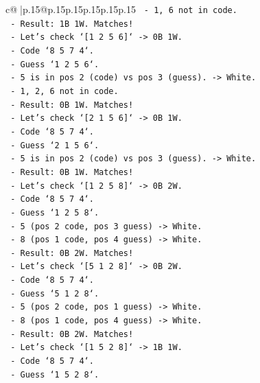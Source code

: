 \documentclass{article}
\begin{document}
{\begin{supertabular}{c@{$\;$}|p{.15\linewidth}@{}p{.15\linewidth}p{.15\linewidth}p{.15\linewidth}p{.15\linewidth}p{.15\linewidth}}
{{{\texttt{          {-} 1, 6 not in code.} \\
\texttt{          {-} Result: 1B 1W. Matches!} \\
\texttt{        {-} Let's check `{[}1 2 5 6{]}` {-}> 0B 1W.} \\
\texttt{          {-} Code `8 5 7 4`.} \\
\texttt{          {-} Guess `1 2 5 6`.} \\
\texttt{          {-} 5 is in pos 2 (code) vs pos 3 (guess). {-}> White.} \\
\texttt{          {-} 1, 2, 6 not in code.} \\
\texttt{          {-} Result: 0B 1W. Matches!} \\
\texttt{        {-} Let's check `{[}2 1 5 6{]}` {-}> 0B 1W.} \\
\texttt{          {-} Code `8 5 7 4`.} \\
\texttt{          {-} Guess `2 1 5 6`.} \\
\texttt{          {-} 5 is in pos 2 (code) vs pos 3 (guess). {-}> White.} \\
\texttt{          {-} Result: 0B 1W. Matches!} \\
\texttt{        {-} Let's check `{[}1 2 5 8{]}` {-}> 0B 2W.} \\
\texttt{          {-} Code `8 5 7 4`.} \\
\texttt{          {-} Guess `1 2 5 8`.} \\
\texttt{          {-} 5 (pos 2 code, pos 3 guess) {-}> White.} \\
\texttt{          {-} 8 (pos 1 code, pos 4 guess) {-}> White.} \\
\texttt{          {-} Result: 0B 2W. Matches!} \\
\texttt{        {-} Let's check `{[}5 1 2 8{]}` {-}> 0B 2W.} \\
\texttt{          {-} Code `8 5 7 4`.} \\
\texttt{          {-} Guess `5 1 2 8`.} \\
\texttt{          {-} 5 (pos 2 code, pos 1 guess) {-}> White.} \\
\texttt{          {-} 8 (pos 1 code, pos 4 guess) {-}> White.} \\
\texttt{          {-} Result: 0B 2W. Matches!} \\
\texttt{        {-} Let's check `{[}1 5 2 8{]}` {-}> 1B 1W.} \\
\texttt{          {-} Code `8 5 7 4`.} \\
\texttt{          {-} Guess `1 5 2 8`.} \\
}}}
\end{supertabular}}
\end{document}
